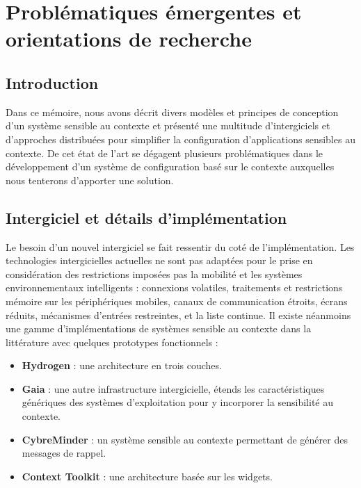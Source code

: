 \chapter{Problématiques émergentes \newline et orientations de recherche}

\section{Introduction}

Dans ce mémoire, nous avons décrit divers modèles et principes de conception
d'un système sensible au contexte et présenté une multitude d'intergiciels et
d'approches distribuées pour simplifier la configuration d'applications
sensibles au contexte. De cet état de l'art se dégagent plusieurs problématiques
dans le développement d'un système de configuration basé sur le contexte
auxquelles nous tenterons d'apporter une solution.

\section{Intergiciel et détails d'implémentation}

Le besoin d'un nouvel intergiciel se fait ressentir du coté de l'implémentation.
Les technologies intergicielles actuelles ne sont pas adaptées pour le prise en
considération des restrictions imposées pas la mobilité et les systèmes
environnementaux intelligents : connexions volatiles, traitements et restrictions
mémoire sur les périphériques mobiles, canaux de communication étroits, écrans
réduits, mécanismes d'entrées restreintes, et la liste continue. Il existe
néanmoins une gamme d'implémentations de systèmes sensible au contexte dans la
littérature avec quelques prototypes fonctionnels :

\begin{itemize}
    \item \textbf{Hydrogen} \cite{hofer_context-awareness_2003}: 
        une architecture en trois couches.
    \item \textbf{Gaia} \cite{chetan_mobile_2005}: 
        une autre infrastructure intergicielle, étends les caractéristiques
        génériques des systèmes d'exploitation pour y incorporer la
        sensibilité au contexte.
    \item \textbf{CybreMinder} \cite{abowd_context-aware_2002}: 
        un système sensible au contexte permettant de générer des messages
        de rappel.
    \item \textbf{Context Toolkit} \cite{dey_conceptual_2001}: 
	    une architecture basée sur les widgets.
\end{itemize}

